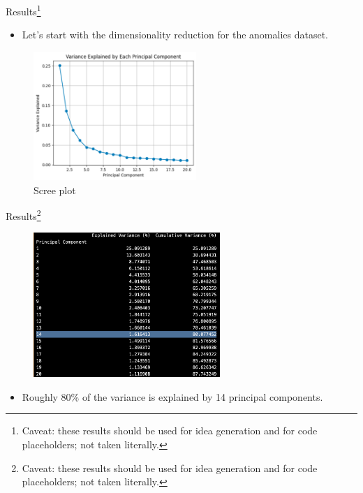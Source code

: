 \documentclass[dvipsnames,mathserif, handout]{beamer}
\begin{document}
{\begin{frame}{Results\footnote{\tiny Caveat: these results should be used for idea generation and for code placeholders; not taken literally.}}
	\begin{itemize}
		\item Let's start with the dimensionality reduction for the anomalies dataset.
	\end{itemize}
	\begin{figure}[!ht]
		\includegraphics[width=175pt]{scree_plot.pdf}
		\caption{\footnotesize Scree plot}
	\end{figure}
\end{frame}	

\begin{frame}{Results\footnote{\tiny Caveat: these results should be used for idea generation and for code placeholders; not taken literally.}}
	\begin{figure}[!ht]
		\includegraphics[width=200pt]{explained_variance.pdf}
	\end{figure}
	\begin{itemize}
		\item Roughly 80\% of the variance is explained by 14 principal components. 
	\end{itemize}
\end{frame}	

}
\end{document}
